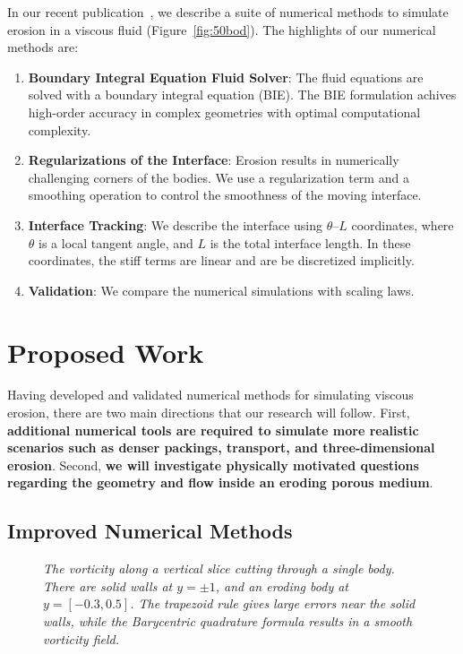 \documentclass[11pt]{article}
\newcommand{\thL}{$\theta$--$L$}
\begin{document}
In our recent publication~\cite{qua-moo2018}, we describe a suite of
numerical methods to simulate erosion in a viscous fluid
(Figure~\ref{fig:50bod}).  The highlights of our numerical methods are:
\begin{enumerate}[topsep=0pt,itemsep=-1ex,partopsep=1ex,parsep=1ex]
  \item {\bf Boundary Integral Equation Fluid Solver}: The
  fluid equations are solved with a boundary integral equation (BIE).
  The BIE formulation achives high-order accuracy in complex geometries
  with optimal computational complexity.

  \item {\bf Regularizations of the Interface}: Erosion results in
  numerically challenging corners of the bodies.  We use a
  regularization term and a smoothing operation to control the
  smoothness of the moving interface.

  \item {\bf Interface Tracking}: We describe the interface using
  {\thL} coordinates, where $\theta$ is a local tangent angle, and $L$
  is the total interface length.  In these coordinates, the
  stiff terms are linear and are be discretized implicitly.

  \item {\bf Validation}: We compare the numerical simulations with
  scaling laws.
\end{enumerate}

\section{Proposed Work}
Having developed and validated numerical methods for simulating viscous
erosion, there are two main directions that our research will follow.
First, {\bf additional numerical tools are required to simulate more
realistic scenarios such as denser packings, transport, and
three-dimensional erosion}.  Second, {\bf we will investigate physically
motivated questions regarding the geometry and flow inside an eroding
porous medium}.

\subsection{Improved Numerical Methods}
\begin{figure}
\centering

\caption{\label{fig:vort1} \em The vorticity along a vertical slice
cutting through a single body.  There are solid walls at $y = \pm 1$,
and an eroding body at $y = [-0.3,0.5]$.  The trapezoid rule gives large
errors near the solid walls, while the Barycentric quadrature formula
results in a smooth vorticity field.}
\end{figure}
\end{document}
